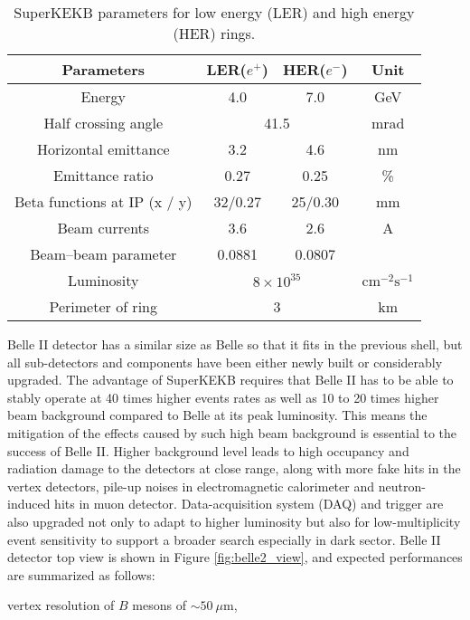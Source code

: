 \begin{table}[H]
	\centering
	\large
	\caption{SuperKEKB parameters for low energy (LER) and high energy (HER) rings.\cite{b2book}}
	\label{tab:superkekb_pars}
	\begin{tabular}{c c c c}
		\toprule
		
		Parameters & LER($e^+$) & HER($e^-$) & Unit\\
		\hline
		Energy & 4.0 & 7.0 & GeV\\
		Half crossing angle & \multicolumn{2}{c}{41.5} & mrad\\
		Horizontal emittance & 3.2 & 4.6 & nm \\
		Emittance ratio & 0.27 & 0.25 & \%\\
		Beta functions at IP (x / y) & 32/0.27 & 25/0.30 & mm\\
		Beam currents & 3.6 & 2.6 &  A \\
		Beam–beam parameter & 0.0881 & 0.0807 & {}\\
		Luminosity & \multicolumn{2}{c}{$8\times 10^{35}$} &  $\text{cm}^{-2} \text{s}^{-1}$\\
		Perimeter of ring & \multicolumn{2}{c}{3} & km\\
		
		\bottomrule
	\end{tabular}
\end{table}


Belle II detector has a similar size as Belle so that it fits in the previous shell, but all sub-detectors and components have been either newly built or considerably upgraded. The advantage of SuperKEKB requires that Belle II has to be able to stably operate at 40 times higher events rates as well as 10 to 20 times higher beam background compared to Belle at its peak luminosity. This means the mitigation of the effects caused by such high beam background is essential to the success of Belle II. Higher background level leads to high occupancy and radiation damage to the detectors at close range, along with more fake hits in the vertex detectors, pile-up noises in electromagnetic calorimeter and neutron-induced hits in muon detector. Data-acquisition system (DAQ) and trigger are also upgraded not only to adapt to higher luminosity but also for low-multiplicity event sensitivity to support a broader search especially in dark sector. Belle II detector top view is shown in Figure \ref{fig:belle2_view}, and expected performances are summarized as follows: 


\textbullet \space vertex resolution of $B$ mesons of $\sim 50 \: \mu\text{m}$,

